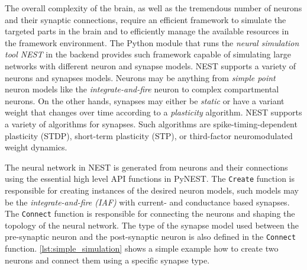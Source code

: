 The overall complexity of the brain, as well as the tremendous number of neurons and their synaptic connections,
require an efficient framework to simulate the targeted parts in the brain and to efficiently manage the available resources in the framework environment. The Python module \citep[\emph{PyNEST};][]{10.3389/neuro.11.012.2008} that runs the \emph{neural simulation tool NEST} \citep{Gewaltig:NEST, spreizer_sebastian_2022_6368024} in the backend provides such framework capable of simulating large networks with different neuron and synapse models. NEST supports a variety of neurons and synapses models. Neurons may be anything from \emph{simple point} neuron models like the \emph{integrate-and-fire} neuron to complex compartmental neurons. On the other hands, synapses may either be \emph{static} or have a variant weight that changes over time according to a \emph{plasticity} algorithm. NEST supports a variety of algorithms for synapses. Such algorithms are spike-timing-dependent plasticity (STDP), short-term plasticity (STP), or third-factor neuromodulated weight dynamics.

The neural network in NEST is generated from neurons and their connections using the essential high level API functions in PyNEST. The \texttt{Create} function is responsible for creating instances of the desired neuron models, such models may be the \emph{integrate-and-fire (IAF)}  with current- and conductance based synapses. The \texttt{Connect} function is responsible for connecting the neurons and shaping the topology of the neural network. The type of the synapse model used between the pre-synaptic neuron and the post-synaptic neuron is also defined in the \texttt{Connect} function.  \autoref{lst:simple_simulation} shows a simple example how to create two neurons and connect them using a specific synapse type.
  

